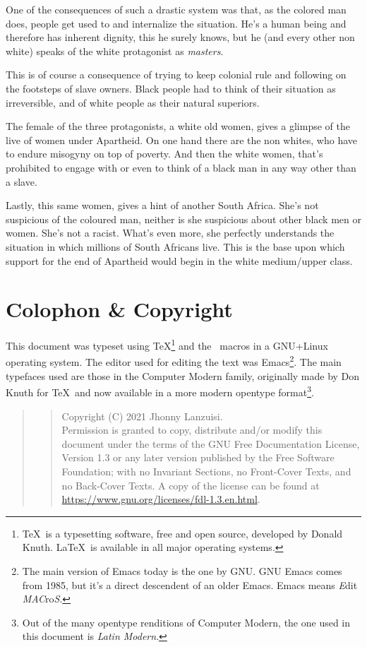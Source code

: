 \documentclass{scrartcl}
\let\oldfootnote\footnote
\renewcommand{\footnote}[1]{\oldfootnote{\textsf{#1}}}
\begin{document}
One of the consequences of such a drastic system was that,
as the colored man does,
people get used to and internalize the situation.
He's a human being and therefore has inherent dignity,
this he surely knows,
but he (and every other non white) speaks
of the white protagonist as \textit{masters}.

This is of course a consequence of trying
to keep colonial rule and following on the
footsteps of slave owners.
Black people had to think of their situation as irreversible,
and of white people as their natural superiors.

The female of the three protagonists,
a white old women,
gives a glimpse of the live of women under Apartheid.
On one hand there are the non whites,
who have to endure misogyny on top of poverty.
And then the white women, that's prohibited to engage with
or even to think of a black man in any way other than a slave.

Lastly, this same women,
gives a hint of another South Africa.
She's not suspicious of the coloured man,
neither is she suspicious about other black men or women.
She's not a racist. What's even more,
she perfectly understands the situation in which
millions of South Africans live.
This is the base upon which support for the end of Apartheid
would begin in the white medium/upper class.
%


\newpage
\section*{Colophon \& Copyright}
This document was typeset using \TeX\footnote{\TeX\ is
a typesetting software, free and open source,
developed by Donald Knuth. \LaTeX\ is available in
all major operating systems.}
and the \LaTeXe\ macros in a GNU+Li\-nux operating system.
The editor used for editing the text was Emacs\footnote{The main version
of Emacs today is the one by GNU. GNU Emacs comes from 1985,
but it's a direct descendent of an older Emacs.
Emacs means \textit{E}dit \textit{MAC}ro\textit{S}.}.
The main typefaces used are those in the Computer Modern family,
originally made by Don Knuth for \TeX\ and now available
in a more modern opentype format\footnote{Out of the many opentype
renditions of Computer Modern, the one used in this document is
\emph{Latin Modern}.}.
\medskip
\begin{quote}\footnotesize
  \begin{quote}
  Copyright (C)  2021 Jhonny Lanzuisi.\\
  Permission is granted to copy, distribute and/or modify this document
  under the terms of the GNU Free Documentation License, Version 1.3
  or any later version published by the Free Software Foundation;
  with no Invariant Sections, no Front-Cover Texts, and no Back-Cover Texts.
  A copy of the license can be found at
  \url{https://www.gnu.org/licenses/fdl-1.3.en.html}.\par
  \end{quote}
\end{quote}
\newpage
\tableofcontents
\end{document}
